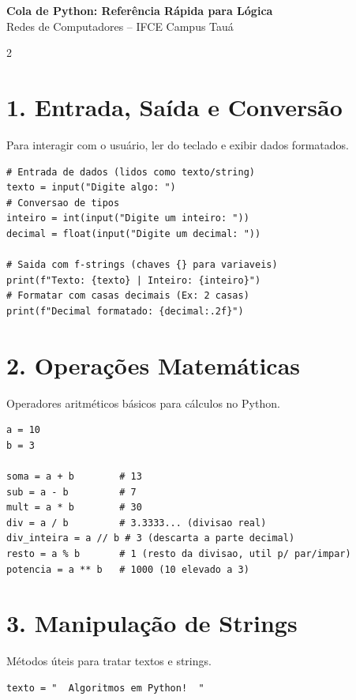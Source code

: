 \documentclass[10pt,a4paper]{article}
\begin{document}
\begin{center}
    {\Large \textbf{Cola de Python: Referência Rápida para Lógica}} \\
    \vspace{0.1cm}
    {\small Redes de Computadores -- IFCE Campus Tauá}
\end{center}
\vspace{0.4cm}

\begin{multicols}{2}

\noindent
\begin{minipage}{\linewidth}
\section*{1. Entrada, Saída e Conversão}
Para interagir com o usuário, ler do teclado e exibir dados formatados.
\begin{lstlisting}
# Entrada de dados (lidos como texto/string)
texto = input("Digite algo: ")
# Conversao de tipos
inteiro = int(input("Digite um inteiro: "))
decimal = float(input("Digite um decimal: "))

# Saida com f-strings (chaves {} para variaveis)
print(f"Texto: {texto} | Inteiro: {inteiro}")
# Formatar com casas decimais (Ex: 2 casas)
print(f"Decimal formatado: {decimal:.2f}")
\end{lstlisting}
\end{minipage}
\vspace{0.4cm}

\noindent
\begin{minipage}{\linewidth}
\section*{2. Operações Matemáticas}
Operadores aritméticos básicos para cálculos no Python.
\begin{lstlisting}
a = 10
b = 3

soma = a + b        # 13
sub = a - b         # 7
mult = a * b        # 30
div = a / b         # 3.3333... (divisao real)
div_inteira = a // b # 3 (descarta a parte decimal)
resto = a % b       # 1 (resto da divisao, util p/ par/impar)
potencia = a ** b   # 1000 (10 elevado a 3)
\end{lstlisting}
\end{minipage}
\vspace{0.4cm}

\noindent
\begin{minipage}{\linewidth}
\section*{3. Manipulação de Strings}
Métodos úteis para tratar textos e strings.
\begin{lstlisting}
texto = "  Algoritmos em Python!  "


\end{lstlisting}
\end{minipage}
\end{multicols}
\end{document}
